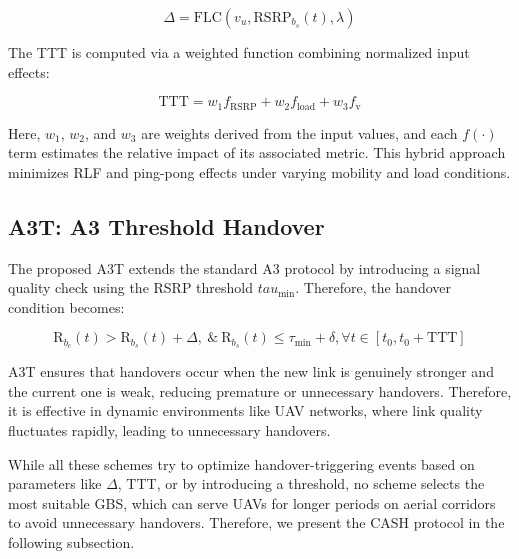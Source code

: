\documentclass[conference]{IEEEtran}
\begin{document}
\begin{equation}
\Delta = \mathrm{FLC}(v_u, \mathrm{RSRP}_{b_s}(t), \lambda)
\end{equation}

The TTT is computed via a weighted function combining normalized input effects:

\begin{equation}
\mathrm{TTT} = w_1 f_{\mathrm{RSRP}} + w_2 f_{\mathrm{load}} + w_3 f_{\mathrm{v}}
\end{equation}

Here, $w_1$, $w_2$, and $w_3$ are weights derived from the input values, and each $f(\cdot)$ term estimates the relative impact of its associated metric. This hybrid approach minimizes RLF and ping-pong effects under varying mobility and load conditions.



\subsection{A3T: A3 Threshold Handover}

The proposed A3T extends the standard A3 protocol by introducing a signal quality check using the RSRP threshold $tau_{\min}$. Therefore, the handover condition becomes:

\begin{equation}
\label{a3teq}
\text{R}_{b_c}(t) > \text{R}_{b_s}(t) + \Delta, \: \text{\&} \: \text{R}_{b_s}(t) \leq \tau_{\min} + \delta,  \forall t \in [t_0, t_0 + \mathrm{TTT}]
\end{equation}

A3T ensures that handovers occur when the new link is genuinely stronger and the current one is weak, reducing premature or unnecessary handovers. Therefore, it is effective in dynamic environments like UAV networks, where link quality fluctuates rapidly, leading to unnecessary handovers.

While all these schemes try to optimize handover-triggering events based on parameters like $\Delta$, TTT, or by introducing a threshold, no scheme selects the most suitable GBS, which can serve UAVs for longer periods on aerial corridors to avoid unnecessary handovers. Therefore, we present the CASH protocol in the following subsection.   
\end{document}
